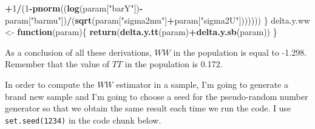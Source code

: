 \documentclass[]{book}
\newenvironment{Shaded}{\begin{snugshade}}{\end{snugshade}}
\newcommand{\ControlFlowTok}[1]{\textcolor[rgb]{0.13,0.29,0.53}{\textbf{#1}}}
\newcommand{\DecValTok}[1]{\textcolor[rgb]{0.00,0.00,0.81}{#1}}
\newcommand{\KeywordTok}[1]{\textcolor[rgb]{0.13,0.29,0.53}{\textbf{#1}}}
\newcommand{\NormalTok}[1]{#1}
\newcommand{\OperatorTok}[1]{\textcolor[rgb]{0.81,0.36,0.00}{\textbf{#1}}}
\newcommand{\StringTok}[1]{\textcolor[rgb]{0.31,0.60,0.02}{#1}}
\theoremstyle{definition}
\theoremstyle{definition}
\theoremstyle{definition}
\theoremstyle{remark}
\begin{document}
\begin{Shaded}
\begin{Highlighting}[]
           \OperatorTok{+}\DecValTok{1}\OperatorTok{/}\NormalTok{(}\DecValTok{1}\OperatorTok{-}\KeywordTok{pnorm}\NormalTok{((}\KeywordTok{log}\NormalTok{(param[}\StringTok{"barY"}\NormalTok{])}\OperatorTok{-}\NormalTok{param[}\StringTok{"barmu"}\NormalTok{])}\OperatorTok{/}\NormalTok{(}\KeywordTok{sqrt}\NormalTok{(param[}\StringTok{"sigma2mu"}\NormalTok{]}\OperatorTok{+}\NormalTok{param[}\StringTok{"sigma2U"}\NormalTok{]))))))}
\NormalTok{\}}
\NormalTok{delta.y.ww <-}\StringTok{ }\ControlFlowTok{function}\NormalTok{(param)\{}
  \KeywordTok{return}\NormalTok{(}\KeywordTok{delta.y.tt}\NormalTok{(param)}\OperatorTok{+}\KeywordTok{delta.y.sb}\NormalTok{(param))}
\NormalTok{\}}
\end{Highlighting}
\end{Shaded}

As a conclusion of all these derivations, \(WW\) in the population is equal to -1.298.
Remember that the value of \(TT\) in the population is 0.172.

In order to compute the \(WW\) estimator in a sample, I'm going to generate a brand new sample and I'm going to choose a seed for the pseudo-random number generator so that we obtain the same result each time we run the code.
I use \texttt{set.seed(1234)} in the code chunk below.
\end{document}
